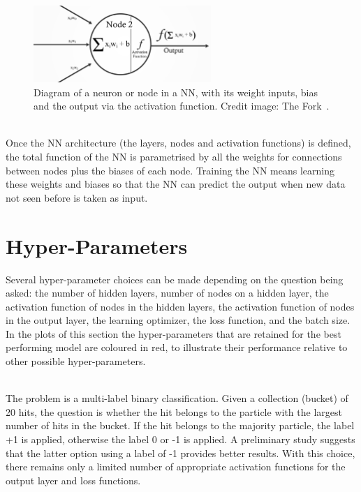 \begin{figure}[h]
  \centering
  \includegraphics[width=0.6\textwidth]{./plots/Neuron.png}
  \caption{Diagram of a neuron or node in a NN, with its weight inputs, bias and the output via the activation function. Credit image: The Fork~\cite{TheFork}.}
  \label{fig:Neuron}
\end{figure}

\ \\Once the NN architecture (the layers, nodes and activation functions) is defined, the total function of the NN is parametrised by all the weights for connections between nodes plus the biases of each node. Training the NN means learning these weights and biases so that the NN can predict the output when new data not seen before is taken as input.

\section{Hyper-Parameters}
\label{sec:Hyperparameters}

Several hyper-parameter choices can be made depending on the question being asked: the number of hidden layers, number of nodes on a hidden layer, the activation function of nodes in the hidden layers, the activation function of nodes in the output layer, the learning optimizer, the loss function, and the batch size. In the plots of this section the hyper-parameters that are retained for the best performing model are coloured in red, to illustrate their performance relative to other possible hyper-parameters.

\ \\The problem is a multi-label binary classification. Given a collection (bucket) of 20 hits, the question is whether the hit belongs to the particle with the largest number of hits in the bucket. If the hit belongs to the majority particle, the label +1 is applied, otherwise the label 0 or -1 is applied. A preliminary study suggests that the latter option using a label of -1 provides better results. With this choice, there remains only a limited number of appropriate activation functions for the output layer and loss functions. 

